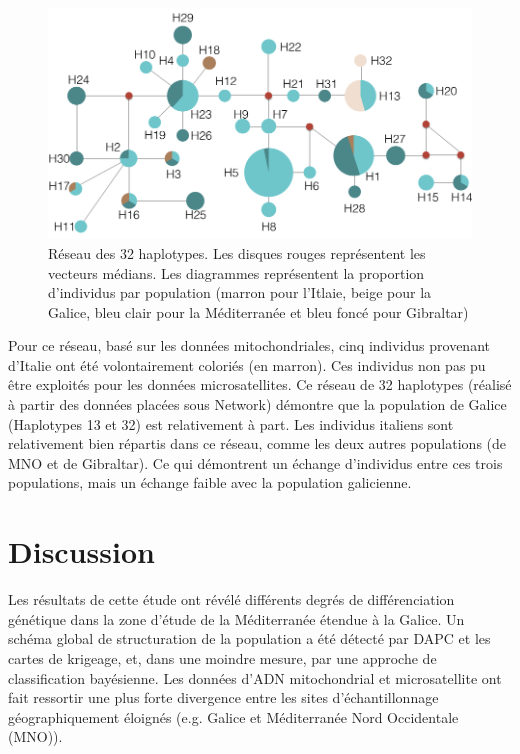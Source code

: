 \documentclass[a4paper,12pt,twoside]{article}\usepackage[]{graphicx}\usepackage[]{color}
\begin{document}
\begin {bibunit} [newbst]
\begin{figure}[h]
   \centering\includegraphics[scale=0.4]{reseau}
   \caption[Réseau d'haplotypes.]{Réseau des 32 haplotypes. Les disques rouges représentent les vecteurs médians. Les diagrammes représentent la proportion d'individus par population (marron pour l'Itlaie, beige pour la Galice, bleu clair pour la Méditerranée et bleu foncé pour Gibraltar)}
\end{figure}
\FloatBarrier

Pour ce réseau, basé sur les données mitochondriales, cinq individus provenant d'Italie ont été volontairement coloriés (en marron). Ces individus non pas pu être exploités pour les données microsatellites.
Ce réseau de 32 haplotypes (réalisé à partir des données placées sous Network) démontre que la population de Galice (Haplotypes 13 et 32) est relativement à part. Les individus italiens sont relativement bien répartis dans ce réseau, comme les deux autres populations (de MNO et de Gibraltar). Ce qui démontrent un échange d'individus entre ces trois populations, mais un échange faible avec la population galicienne.

\section{Discussion} 

Les résultats de cette étude ont révélé différents degrés de différenciation génétique dans la zone d'étude de la Méditerranée étendue à la Galice. Un schéma global de structuration de la population a été détecté par DAPC et les cartes de krigeage, et, dans une moindre mesure, par une approche de classification bayésienne. Les données d'ADN mitochondrial et microsatellite ont fait ressortir une plus forte divergence entre les sites d'échantillonnage géographiquement éloignés (e.g. Galice et Méditerranée Nord Occidentale (MNO)).


\end{bibunit}
\end{document}
